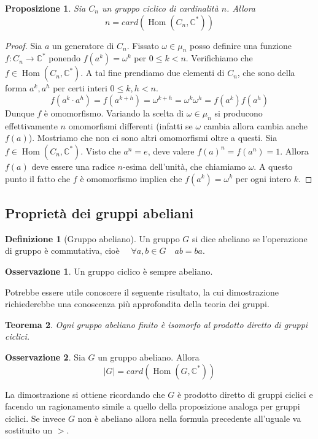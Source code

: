 \documentclass[11pt]{article}
\theoremstyle{plain}
\newtheorem{thm}{Teorema}[section]
\newtheorem{prop}[thm]{Proposizione}
\theoremstyle{definition}
\newtheorem{defn}{Definizione}[section]
\newtheorem*{rem}{Osservazione}
\theoremstyle{remark}
\newcommand{\C}{\mathbb{C}}
\DeclareMathOperator{\Hom}{Hom}
\begin{document}
\begin{prop} Sia $C_n$ un gruppo ciclico di cardinalità $n$. Allora
\[ n = card(\Hom(C_n,\C^*))\]
\end{prop}
\begin{proof} Sia $a$ un generatore di $C_n$. Fissato $\omega\in\mu_n$ posso definire
una funzione $f:C_n\to\C^*$ ponendo $f(a^k) = \omega^k$ per $0\le k < n$.
Verifichiamo che $f\in \Hom(C_n, \C^*)$. A tal fine prendiamo due elementi di $C_n$, che sono della forma $a^k, a^h$ per certi interi $0\le k,h < n$.
\[f(a^k \cdot a^h) = f(a^{k+h}) = \omega^{k+h} = \omega^k \omega^h = f(a^k)f(a^h)\]
Dunque $f$ è omomorfismo. Variando la scelta di $\omega\in\mu_n$ si producono effettivamente $n$ omomorfismi differenti (infatti se $\omega$ cambia allora cambia anche $f(a)$).
Mostriamo che non ci sono altri omomorfismi oltre a questi.
Sia $f\in \Hom(C_n,\C^*)$. Visto che $a^n=e$, deve valere $f(a)^n = f(a^n) = 1$. Allora $f(a)$ deve essere una radice $n$-esima
dell'unità, che chiamiamo $\omega$. A questo punto il fatto che $f$ è omomorfismo implica che $f(a^k) = \omega^k$ per ogni intero $k$.
\end{proof}


\subsection{Proprietà dei gruppi abeliani}
\begin{defn}[Gruppo abeliano] Un gruppo $G$ si dice abeliano se l'operazione di gruppo è commutativa, cioè $\quad\forall a,b\in G\quad ab=ba$.
\end{defn}

\begin{rem} Un gruppo ciclico è sempre abeliano.
\end{rem}

Potrebbe essere utile conoscere il seguente risultato, la cui dimostrazione richiederebbe una conoscenza più approfondita della teoria dei gruppi.
\begin{thm}Ogni gruppo abeliano finito è isomorfo al prodotto diretto di gruppi ciclici.
\end{thm}

\begin{rem} Sia $G$ un gruppo abeliano. Allora
\[ |G| = card(\Hom(G,\C^*))\]

La dimostrazione si ottiene ricordando che $G$ è prodotto diretto di gruppi ciclici e facendo un ragionamento simile a quello
della proposizione analoga per gruppi ciclici.
Se invece $G$ non è abeliano allora nella formula precedente all'uguale va sostituito un $>$.
\end{rem}
\end{document}

